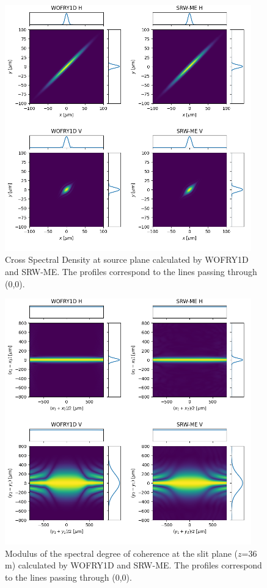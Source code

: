 \documentclass{iucr}              %
\begin{document}
\begin{figure}
    \label{fig:plot_CSD_at_source}
    \includegraphics[width=0.95\textwidth]{figures/plot_CSD_at_source.png}
    \caption{Cross Spectral Density at source plane calculated by WOFRY1D and SRW-ME.
    The profiles correspond to the lines passing through (0,0).
    }
\end{figure}

\begin{figure}
    \label{fig:plot_DoC_at_36m}
    \includegraphics[width=0.95\textwidth]{figures/plot_DoC_at_36m.png}
    \caption{Modulus of the spectral degree of coherence at the slit plane ($z$=36 m) calculated by WOFRY1D and SRW-ME.
    The profiles correspond to the lines passing through (0,0).
    }
\end{figure}
\end{document}
